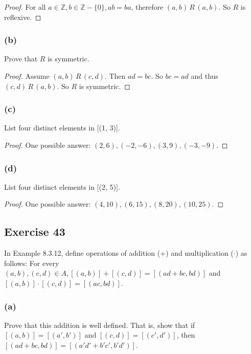 \documentclass[14pt]{extarticle}
\newcommand{\Z}{\mathbb{Z}}
\begin{document}
\begin{proof}
        For all \(a \in \Z, b \in \Z - \{0\}, ab = ba\), therefore \((a,b) \,R\, (a,b)\). So $R$ is reflexive.
\end{proof}

\subsubsection{(b)}
Prove that $R$ is symmetric.

\begin{proof}
        Assume \((a,b) \,R\, (c,d)\). Then \(ad = bc\). So \(bc = ad\) and thus \((c,d) \,R\, (a,b)\). So $R$ is symmetric.
\end{proof}

\subsubsection{(c)}
List four distinct elements in [(1, 3)].

\begin{proof}
        One possible answer: \((2, 6), (-2, -6), (3, 9), (-3, -9)\).
\end{proof}

\subsubsection{(d)}
List four distinct elements in [(2, 5)].

\begin{proof}
        One possible answer: \((4, 10), (6, 15), (8, 20), (10, 25)\).
\end{proof}

\subsection{Exercise 43}
In Example 8.3.12, define operations of addition (+) and multiplication (\(\cdot\)) as follows: For every \((a, b),
(c, d) \in A, [(a, b)] + [(c, d)] = [(ad + bc, bd)]\) and \([(a, b)] \cdot [(c, d)] = [(ac, bd)]\).

\subsubsection{(a)}
Prove that this addition is well defined. That is, show that if \([(a, b)] = [(a', b')]\) and \([(c, d)] = [(c',
d')]\), then \([(ad + bc, bd)] = [(a'd' + b'c', b'd')]\).
\end{document}
